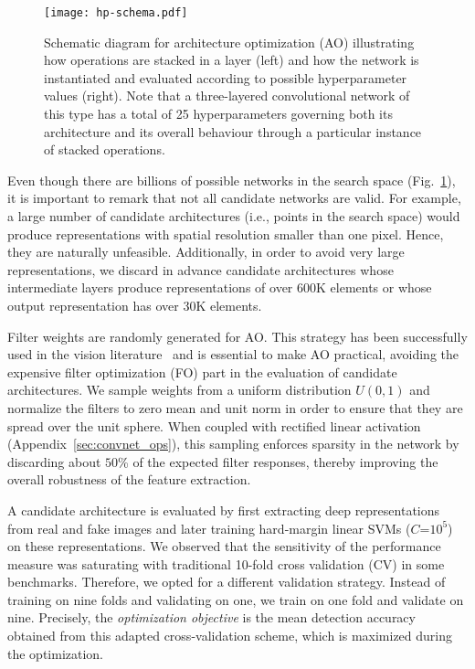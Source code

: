 \begin{figure}
\begin{center}
 \texttt{[image: hp-schema.pdf]}
 \caption{Schematic diagram for architecture optimization (AO) illustrating how operations are stacked in a layer (left) and how the network is instantiated and evaluated according to possible hyperparameter values (right). Note that a three-layered convolutional network of this type has a total of 25 hyperparameters governing both its architecture and its overall behaviour through a particular instance of stacked operations.}
 \label{fig:framework}
\end{center}
\end{figure}


Even though there are billions of possible networks in the search space (Fig.~\ref{fig:framework}), it is important to remark that not all candidate networks are valid. For example, a large number of candidate architectures (i.e., points in the search space) would produce representations with spatial resolution smaller than one pixel. Hence, they are naturally unfeasible.
Additionally, in order to avoid very large representations, we discard in advance candidate architectures whose intermediate layers produce representations of over 600K elements or whose output representation has over 30K elements.


Filter weights are randomly generated for AO. This strategy has been successfully used in the vision literature~\cite{Pinto:2009,Saxe:2011,Pinto:2011b,Jarrett:2009} and is essential to make AO practical, avoiding the expensive filter optimization (FO) part in the evaluation of candidate architectures. We sample weights from a uniform distribution $U(0,1)$ and normalize the filters to zero mean and unit norm in order to ensure that they are spread over the unit sphere. When coupled with rectified linear activation (Appendix~\ref{sec:convnet_ops}), this sampling enforces sparsity in the network by discarding about $50$\% of the expected filter responses, thereby improving the overall robustness of the feature extraction.

A candidate architecture is evaluated by first extracting deep representations from real and fake images and later training hard-margin linear SVMs ($C$=$10^5$) on these representations.
We observed that the sensitivity of the performance measure was saturating with traditional 10-fold cross validation (CV) in some benchmarks. Therefore, we opted for a different validation strategy. Instead of training on nine folds and validating on one, we train on one fold and validate on nine. Precisely, the \emph{optimization objective} is the mean detection accuracy obtained from this adapted cross-validation scheme, which is maximized during the optimization.

